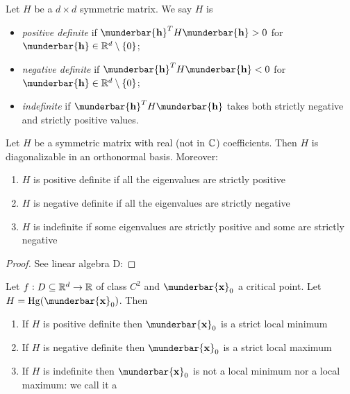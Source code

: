 \documentclass[14pt]{extarticle}
\renewcommand{\vec}[1]{\munderbar{\mathbf{#1}}}
\newcommand{\Hg}{{\operatorfont Hg}}
\begin{document}
\begin{definition}
    Let $H$ be a $d\times d$ symmetric matrix. We say $H$ is
    \begin{itemize}
        \item \emph{positive definite} if $\vec h^T H \vec h > 0$ for $\vec h \in \R^d \setminus \{0\}$;
        \item \emph{negative definite} if $\vec h^T H \vec h < 0$ for $\vec h \in \R^d \setminus \{0\}$;
        \item \emph{indefinite} if $\vec h^T H \vec h$ takes both strictly negative and strictly positive values.
    \end{itemize}
\end{definition}

\begin{theorem}
    Let $H$ be a symmetric matrix with real (not in $\mathbb{C}$) coefficients.
    Then $H$ is diagonalizable in an orthonormal basis.
    Moreover:
    \begin{enumerate}[label=\roman*.]
        \item $H$ is positive definite if all the eigenvalues are strictly positive
        \item $H$ is negative definite if all the eigenvalues are strictly negative
        \item $H$ is indefinite if some eigenvalues are strictly positive and some are strictly negative
    \end{enumerate}
\end{theorem}
\begin{proof}
    See linear algebra D:
\end{proof}

\begin{theorem}
    Let $f: D\subseteq \mathbb{R}^d \to \mathbb{R}$ of class $C^2$ and $\vec x_0$ a critical point.
    Let $H = \Hg(\vec x_0)$.
    Then
    \begin{enumerate}[label=\roman*.]
        \item If $H$ is positive definite then $\vec x_0$ is a strict local minimum
        \item If $H$ is negative definite then $\vec x_0$ is a strict local maximum
        \item If $H$ is indefinite then $\vec x_0$ is not a local minimum nor a local maximum: we call it a 
    \end{enumerate}
\end{theorem}
\end{document}
